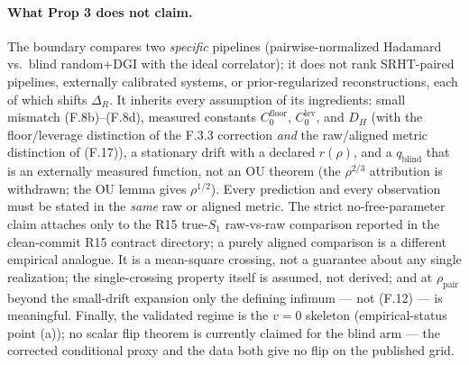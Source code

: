 \paragraph{What Prop 3 does not claim.} The boundary compares two \emph{specific} pipelines (pairwise-normalized Hadamard vs.\ blind random+DGI with the ideal correlator); it does not rank SRHT-paired pipelines, externally calibrated systems, or prior-regularized reconstructions, each of which shifts $\Delta_R$. It inherits every assumption of its ingredients: small mismatch (F.8b)--(F.8d), measured constants $C_0^{\mathrm{floor}}$, $C_0^{\mathrm{lev}}$, and $D_H$ (with the floor/leverage distinction of the F.3.3 correction \emph{and} the raw/aligned metric distinction of (F.17)), a stationary drift with a declared $r(\rho)$, and a $q_{\mathrm{blind}}$ that is an externally measured function, not an OU theorem (the $\rho^{2/3}$ attribution is withdrawn; the OU lemma gives $\rho^{1/2}$). Every prediction and every observation must be stated in the \emph{same} raw or aligned metric. The strict no-free-parameter claim attaches only to the R15 true-$S_1$ raw-vs-raw comparison reported in the clean-commit R15 contract directory; a purely aligned comparison is a different empirical analogue. It is a mean-square crossing, not a guarantee about any single realization; the single-crossing property itself is assumed, not derived; and at $\rho_{\mathrm{pair}}$ beyond the small-drift expansion only the defining infimum --- not (F.12) --- is meaningful. Finally, the validated regime is the $v=0$ skeleton (empirical-status point (a)); no scalar flip theorem is currently claimed for the blind arm --- the corrected conditional proxy and the data both give no flip on the published grid.
